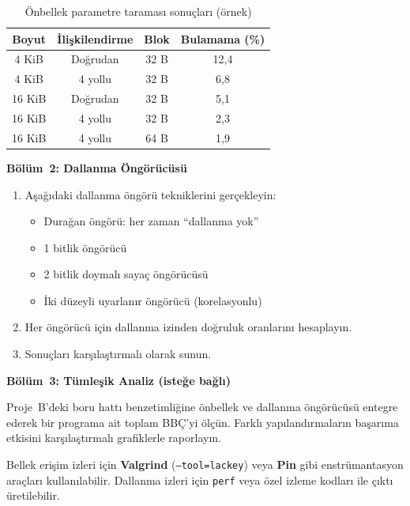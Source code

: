 \begin{table}[H]
\centering
\caption[Önbellek parametre taraması örneği]{Önbellek parametre taraması sonuçları (örnek)}
\label{tab:ekd-onbellek-tarama}
\begin{tabular}{@{}cccc@{}}
\toprule
\textbf{Boyut} & \textbf{İlişkilendirme} & \textbf{Blok} & \textbf{Bulamama (\%)} \\
\midrule
4 KiB   & Doğrudan   & 32 B & 12{,}4 \\
4 KiB   & 4 yollu    & 32 B &  6{,}8 \\
16 KiB  & Doğrudan   & 32 B &  5{,}1 \\
16 KiB  & 4 yollu    & 32 B &  2{,}3 \\
16 KiB  & 4 yollu    & 64 B &  1{,}9 \\
\bottomrule
\end{tabular}
\end{table}

\textbf{Bölüm~2: Dallanma Öngörücüsü}
\begin{enumerate}[leftmargin=2em]
    \item Aşağıdaki dallanma öngörü tekniklerini gerçekleyin:
    \begin{itemize}[leftmargin=1.5em]
        \item Durağan öngörü: her zaman ``dallanma yok''
        \item 1 bitlik öngörücü
        \item 2 bitlik doymalı sayaç öngörücüsü
        \item İki düzeyli uyarlanır öngörücü (korelasyonlu)
    \end{itemize}
    \item Her öngörücü için dallanma izinden doğruluk oranlarını hesaplayın.
    \item Sonuçları karşılaştırmalı olarak sunun.
\end{enumerate}

\textbf{Bölüm~3: Tümleşik Analiz (isteğe bağlı)}

Proje~B'deki boru hattı benzetimliğine önbellek ve dallanma öngörücüsü entegre ederek bir programa ait toplam BBÇ'yi ölçün. Farklı yapılandırmaların başarıma etkisini karşılaştırmalı grafiklerle raporlayın.

\begin{bilginot}
Bellek erişim izleri için \textbf{Valgrind} (\texttt{--tool=lackey}) veya \textbf{Pin} gibi enstrümantasyon araçları kullanılabilir. Dallanma izleri için \texttt{perf} veya özel izleme kodları ile çıktı üretilebilir.
\end{bilginot}


